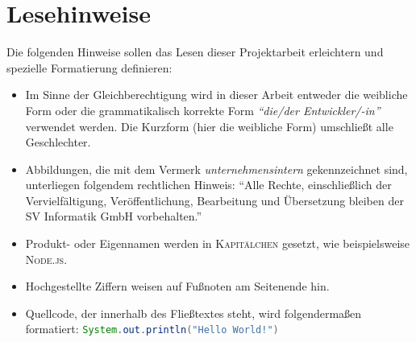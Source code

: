 \chapter*{Lesehinweise}
Die folgenden Hinweise sollen das Lesen dieser Projektarbeit erleichtern und spezielle Formatierung definieren:

\begin{itemize}
	\item Im Sinne der Gleichberechtigung wird in dieser Arbeit entweder die weibliche Form oder die grammatikalisch korrekte Form \textit{\enquote{die/der Entwickler/-in}} verwendet werden. Die Kurzform (hier die weibliche Form) umschließt alle Geschlechter.
	\item Abbildungen, die mit dem Vermerk \textit{unternehmensintern} gekennzeichnet sind, unterliegen folgendem rechtlichen Hinweis: \enquote{Alle Rechte, einschließlich der Vervielfältigung, Veröffentlichung, Bearbeitung und Übersetzung bleiben der SV Informatik GmbH vorbehalten.}
	\item Produkt- oder Eigennamen werden in \textsc{Kapitälchen} gesetzt, wie beispielsweise \textsc{Node.js}.
	\item Hochgestellte Ziffern weisen auf Fußnoten am Seitenende hin.
	\item Quellcode, der innerhalb des Fließtextes steht, wird folgendermaßen formatiert: \lstinline[language=Java]|System.out.println("Hello World!")|
	
	
\end{itemize}
 